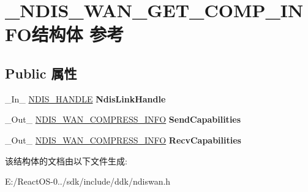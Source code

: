 \hypertarget{struct___n_d_i_s___w_a_n___g_e_t___c_o_m_p___i_n_f_o}{}\section{\+\_\+\+N\+D\+I\+S\+\_\+\+W\+A\+N\+\_\+\+G\+E\+T\+\_\+\+C\+O\+M\+P\+\_\+\+I\+N\+F\+O结构体 参考}
\label{struct___n_d_i_s___w_a_n___g_e_t___c_o_m_p___i_n_f_o}
\subsection*{Public 属性}
\begin{DoxyCompactItemize}
\item 
\mbox{\label{struct___n_d_i_s___w_a_n___g_e_t___c_o_m_p___i_n_f_o_a6b85148c037f4a394b23946fd88eb44e}} 
\+\_\+\+In\+\_\+ \hyperlink{interfacevoid}{N\+D\+I\+S\+\_\+\+H\+A\+N\+D\+LE} {\bfseries Ndis\+Link\+Handle}
\item 
\mbox{\label{struct___n_d_i_s___w_a_n___g_e_t___c_o_m_p___i_n_f_o_a0ea18255d0fbabbfc45031545cb60027}} 
\+\_\+\+Out\+\_\+ \hyperlink{struct___n_d_i_s___w_a_n___c_o_m_p_r_e_s_s___i_n_f_o}{N\+D\+I\+S\+\_\+\+W\+A\+N\+\_\+\+C\+O\+M\+P\+R\+E\+S\+S\+\_\+\+I\+N\+FO} {\bfseries Send\+Capabilities}
\item 
\mbox{\label{struct___n_d_i_s___w_a_n___g_e_t___c_o_m_p___i_n_f_o_a1578804e9a44c1b72f385f2eaa0cc193}} 
\+\_\+\+Out\+\_\+ \hyperlink{struct___n_d_i_s___w_a_n___c_o_m_p_r_e_s_s___i_n_f_o}{N\+D\+I\+S\+\_\+\+W\+A\+N\+\_\+\+C\+O\+M\+P\+R\+E\+S\+S\+\_\+\+I\+N\+FO} {\bfseries Recv\+Capabilities}
\end{DoxyCompactItemize}


该结构体的文档由以下文件生成\+:\begin{DoxyCompactItemize}
\item 
E\+:/\+React\+O\+S-\/0../sdk/include/ddk/ndiswan.\+h\end{DoxyCompactItemize}
